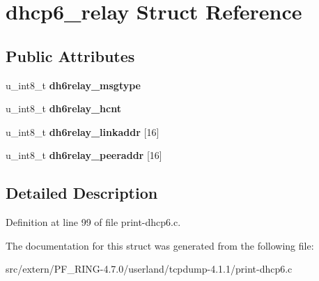 \hypertarget{structdhcp6__relay}{
\section{dhcp6\_\-relay Struct Reference}
\label{structdhcp6__relay}
}
\subsection*{Public Attributes}
\begin{DoxyCompactItemize}
\item 
\hypertarget{structdhcp6__relay_ae096256ebcac2e2396b6df40e5a16267}{
u\_\-int8\_\-t {\bfseries dh6relay\_\-msgtype}}
\label{structdhcp6__relay_ae096256ebcac2e2396b6df40e5a16267}

\item 
\hypertarget{structdhcp6__relay_ac0f0dafbddc8e8a2beca28f7b56b73cf}{
u\_\-int8\_\-t {\bfseries dh6relay\_\-hcnt}}
\label{structdhcp6__relay_ac0f0dafbddc8e8a2beca28f7b56b73cf}

\item 
\hypertarget{structdhcp6__relay_a1962d9b1d195464f1385ce49a2527d7d}{
u\_\-int8\_\-t {\bfseries dh6relay\_\-linkaddr} \mbox{[}16\mbox{]}}
\label{structdhcp6__relay_a1962d9b1d195464f1385ce49a2527d7d}

\item 
\hypertarget{structdhcp6__relay_a645129605647162b957d253c646fd76c}{
u\_\-int8\_\-t {\bfseries dh6relay\_\-peeraddr} \mbox{[}16\mbox{]}}
\label{structdhcp6__relay_a645129605647162b957d253c646fd76c}

\end{DoxyCompactItemize}


\subsection{Detailed Description}


Definition at line 99 of file print-\/dhcp6.c.



The documentation for this struct was generated from the following file:\begin{DoxyCompactItemize}
\item 
src/extern/PF\_\-RING-\/4.7.0/userland/tcpdump-\/4.1.1/print-\/dhcp6.c\end{DoxyCompactItemize}
